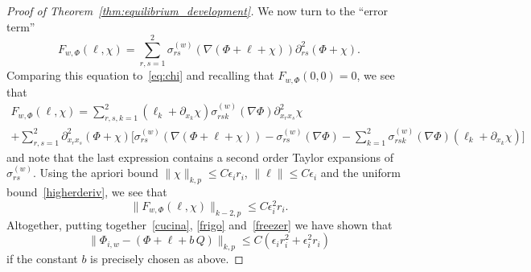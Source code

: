 \documentclass[AHL,Unicode,longabstracts,published]{cedram}
\newcommand{\norm}[1]{\lVert #1 \rVert}
\newcommand{\eps}{\epsilon}
\begin{document}
\begin{proof}[Proof of Theorem~\ref{thm:equilibrium_development}]
We now turn to the ``error term''
\begin{equation}
F_{w,\Phi}(\ell,\chi) = \sum_{r,s=1}^2 \sigma_{rs}^{(w)}(\nabla ({\Phi} + \ell + {\chi})) \partial^2_{rs} (\Phi + \chi).
\end{equation}
Comparing this equation to~\eqref{eq:chi} and recalling that $F_{w,\Phi}(0,0)=0$, we see that
\begin{multline}
F_{w,\Phi}(\ell,\chi)= \sum_{r,s,k=1}^2(\ell_k+\partial_{x_k}\chi)\sigma^{(w)}_{rsk}(\nabla\Phi) \partial^2_{x_r x_s}\chi \\+
\sum_{r,s=1}^2\partial^2_{x_r x_s}(\Phi+\chi)\Big[
\sigma^{(w)}_{rs}(\nabla ({\Phi} + \ell + {\chi}))-\sigma^{(w)}_{rs}(\nabla\Phi)-\sum_{k=1}^2\sigma^{(w)}_{rsk}(\nabla\Phi)(\ell_k+\partial_{x_k}\chi)\Big]
\end{multline}
and note that the last expression contains a second order Taylor expansions of $\sigma_{rs}^{(w)}$. Using the apriori bound $\norm{ \chi}_{k, p} \leq C \eps_i r_i$, $\|\ell\|\le C\epsilon_i$ and the uniform bound~\eqref{higherderiv}, we see that
\begin{equation}\label{freezer}
\norm{F_{w,\Phi}(\ell,\chi)}_{k-2, p} \leq C \eps_i^2 r_i.
\end{equation}
Altogether, putting together~\eqref{cucina}, \eqref{frigo} and~\eqref{freezer} we have shown that
\begin{equation}\label{ottperPhi}
\|\Phi_{i,w}-(\Phi+\ell+b\,Q)\|_{k,p}\le C\left(\epsilon_i r_i^2+\epsilon_i^2 r_i\right)
\end{equation}
if the constant $b$ is precisely chosen as above.


\end{proof}
\end{document}
